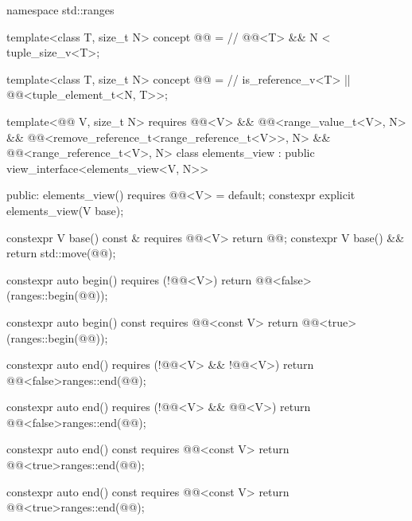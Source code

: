 %
%
%
%
%
\begin{codeblock}
namespace std::ranges {
  template<class T, size_t N>
  concept @@ =                   // \expos
    @@<T> && N < tuple_size_v<T>;

  template<class T, size_t N>
  concept @@ =                  // \expos
    is_reference_v<T> || @@<tuple_element_t<N, T>>;

  template<@@ V, size_t N>
    requires @@<V> && @@<range_value_t<V>, N> &&
             @@<remove_reference_t<range_reference_t<V>>, N> &&
             @@<range_reference_t<V>, N>
  class elements_view : public view_interface<elements_view<V, N>> {
  public:
    elements_view() requires @@<V> = default;
    constexpr explicit elements_view(V base);

    constexpr V base() const & requires @@<V> { return @@; }
    constexpr V base() && { return std::move(@@); }

    constexpr auto begin() requires (!@@<V>)
    { return @@<false>(ranges::begin(@@)); }

    constexpr auto begin() const requires @@<const V>
    { return @@<true>(ranges::begin(@@)); }

    constexpr auto end() requires (!@@<V> && !@@<V>)
    { return @@<false>{ranges::end(@@)}; }

    constexpr auto end() requires (!@@<V> && @@<V>)
    { return @@<false>{ranges::end(@@)}; }

    constexpr auto end() const requires @@<const V>
    { return @@<true>{ranges::end(@@)}; }

    constexpr auto end() const requires @@<const V>
    { return @@<true>{ranges::end(@@)}; }

}}
\end{codeblock}
